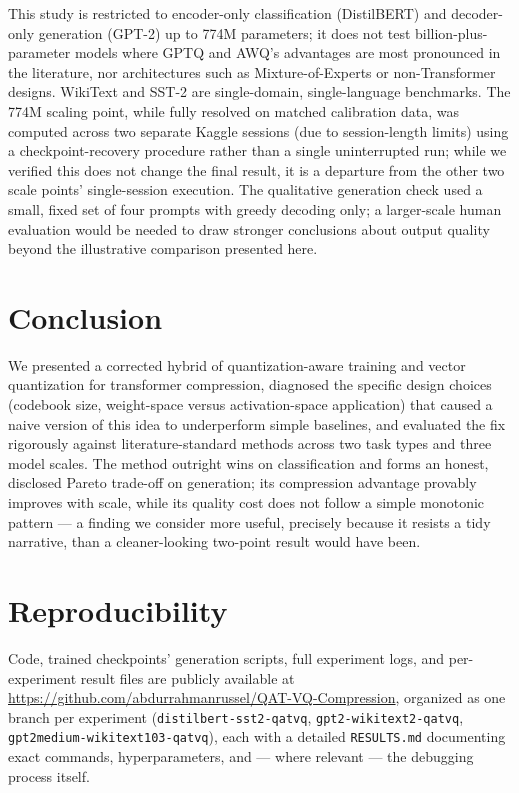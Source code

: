 \documentclass[11pt]{article}
\begin{document}
This study is restricted to encoder-only classification (DistilBERT) and
decoder-only generation (GPT-2) up to 774M parameters; it does not test
billion-plus-parameter models where GPTQ and AWQ's advantages are most
pronounced in the literature, nor architectures such as Mixture-of-Experts
or non-Transformer designs. WikiText and SST-2 are single-domain,
single-language benchmarks. The 774M scaling point, while fully resolved on
matched calibration data, was computed across two separate Kaggle sessions
(due to session-length limits) using a checkpoint-recovery procedure rather
than a single uninterrupted run; while we verified this does not change the
final result, it is a departure from the other two scale points'
single-session execution. The qualitative generation check used a small,
fixed set of four prompts with greedy decoding only; a larger-scale human
evaluation would be needed to draw stronger conclusions about output
quality beyond the illustrative comparison presented here.

\section{Conclusion}

We presented a corrected hybrid of quantization-aware training and vector
quantization for transformer compression, diagnosed the specific design
choices (codebook size, weight-space versus activation-space application)
that caused a naive version of this idea to underperform simple baselines,
and evaluated the fix rigorously against literature-standard methods
across two task types and three model scales. The method outright wins on
classification and forms an honest, disclosed Pareto trade-off on
generation; its compression advantage provably improves with scale, while
its quality cost does not follow a simple monotonic pattern --- a finding
we consider more useful, precisely because it resists a tidy narrative,
than a cleaner-looking two-point result would have been.

\section*{Reproducibility}

Code, trained checkpoints' generation scripts, full experiment logs, and
per-experiment result files are publicly available at
\url{https://github.com/abdurrahmanrussel/QAT-VQ-Compression}, organized
as one branch per experiment (\texttt{distilbert-sst2-qatvq},
\texttt{gpt2-wikitext2-qatvq}, \texttt{gpt2medium-wikitext103-qatvq}),
each with a detailed \texttt{RESULTS.md} documenting exact commands,
hyperparameters, and — where relevant — the debugging process itself.



\end{document}
